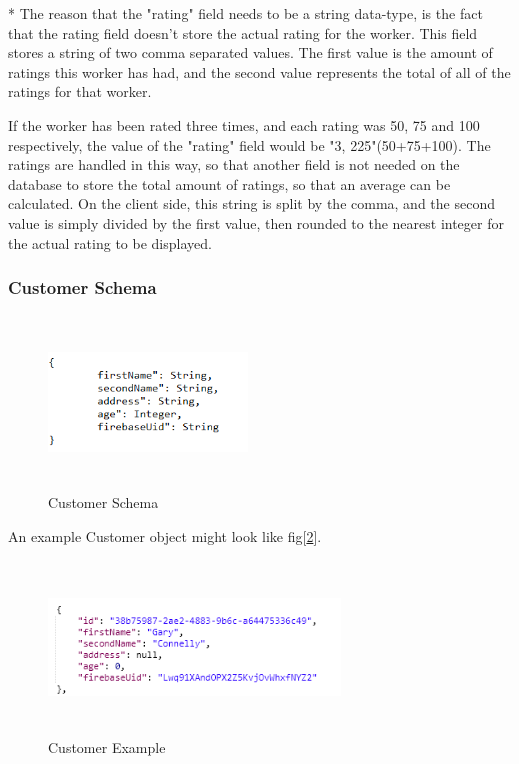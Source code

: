 * The reason that the "rating" field needs to be a string data-type, is the fact that the rating field doesn't store the actual rating for the worker. This field stores a string of two comma separated values. The first value is the amount of ratings this worker has had, and the second value represents the total of all of the ratings for that worker. 

If the worker has been rated three times, and each rating was 50, 75 and 100 respectively, the value of the "rating" field would be "3, 225"(50+75+100). The ratings are handled in this way, so that another field is not needed on the database to store the total amount of ratings, so that an average can be calculated. On the client side, this string is split by the comma, and the second value is simply divided by the first value, then rounded to the nearest integer for the actual rating to be displayed.
\bigskip

\subsubsection{Customer Schema}
\label{sec:SystemDesignCustomerSchema}

\begin{figure}[H]
    \centering
    \includegraphics[width=150pt, height=130pt]{DesignImages/CustomerSchema.PNG}
    \caption{Customer Schema}
    \label{fig:my_label}
\end{figure}

\bigskip

An example Customer object might look like fig[\ref{fig:customerExample}].

\begin{figure}[H]
    \centering
    \includegraphics[width=220pt, height=130pt]{DesignImages/CustomerObject.PNG}
    \caption{Customer Example}
    \label{fig:customerExample}
\end{figure}

